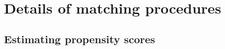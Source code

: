 \documentclass[11pt,titlepage]{article}
\begin{document}
\begin{comment}
[From earlier version.]
 Similar to exact matching, propensity score matching is simply a means
to obtain a balanced dataset, and the
variance of the sample ATT is the same as in Equation~\ref{VarATT}.
The only difference is the fact that the missing potential outcome
$\hat{Y}_i(0) | T=1$ is now estimated by the matched control unit \emph{via the propensity
score}.  Since the propensity score does not estimate any population
parameter and serves its role purely as a ``balancing score'', it does
not introduce any added uncertainty to the variance of the treatment
effect.\footnote{There is one slight exception to this, namely that
  ties in the propensity score are resolved by a random draw.  This is
  a scenario that is likely to happen when the explanatory covariates
  are largely categorical.  Even in this instance, reporting estimates
  from one draw of matched pairs is correct (akin to drawing a random
  sample from a population), but to avoid potentially ``spurious'' findings, the 
  user might well be advised to impute
  missing potential outcomes several times and combine estimates
  across these datasets via standard multiple imputation rules
  (see \citealt{rubin87}).}  (Note, however, that knowledge of the propensity score might decrease the
variance bound for the ATT, but not the ATE
(\citealt{frolich02,hahn98,HirImbRid02}).)  In fact, this variance
estimate might even be conservative for the sample ATT, providing
over-coverage compared to the variance conditional on the
covariates (\citealt{AbaImbND}).
If on the other hand we are interested in the population ATT, the
variance may be estimated by the bootstrap, or even the Neyman
estimate in Note~\ref{neyman} (\citealt{ImbensNDb}, \citealt[Chapter
6]{ImbRubND}).
\end{comment}

                                                                                                                                                             
\section{Details of matching procedures}
\subsection{Estimating propensity scores}
\label{pscorest}
\end{document}
